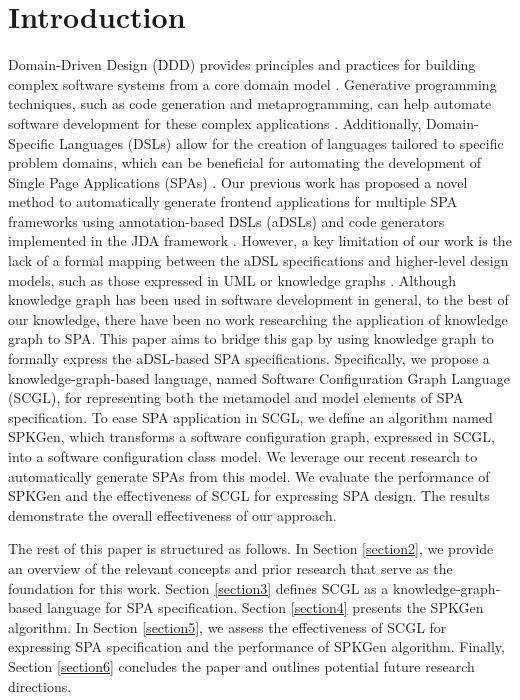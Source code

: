 \documentclass[runningheads]{llncs}
\begin{document}
\section{Introduction}

Domain-Driven Design (DDD) provides principles and practices for building complex software systems from a core domain model \cite{evans_domain-driven_2004}. Generative programming techniques, such as code generation and metaprogramming, can help automate software development for these complex applications \cite{czarnecki_generative_2002}. Additionally, Domain-Specific Languages (DSLs) allow for the creation of languages tailored to specific problem domains, which can be beneficial for automating the development of Single Page Applications (SPAs) \cite{fowler_domain-specific_2010}. Our previous work has proposed a novel method to automatically generate frontend applications for multiple SPA frameworks using annotation-based DSLs (aDSLs) and code generators implemented in the JDA framework \cite{le_jdomainapp_2019,le_generating_2022,le_modularly_2024}. However, a key limitation of our work is the lack of a formal mapping between the aDSL specifications and higher-level design models, such as those expressed in UML or knowledge graphs \cite{omg2017uml,wang_application_2023}. Although knowledge graph has been used in software development in general, to the best of our knowledge, there have been no work researching the application of knowledge graph to SPA. This paper aims to bridge this gap by using knowledge graph to formally express the aDSL-based SPA specifications. Specifically, we propose a  knowledge-graph-based language, named Software Configuration Graph Language (SCGL), for representing both the metamodel and model elements of SPA specification. To ease SPA application in SCGL, we define an algorithm named SPKGen, which transforms a software configuration graph, expressed in SCGL, into a software configuration class model. We leverage our recent research \cite{le_generating_2022,le_modularly_2024} to automatically generate SPAs from this model. We evaluate the performance of SPKGen and the effectiveness of SCGL for expressing SPA design. The results demonstrate the overall effectiveness of our approach. 

The rest of this paper is structured as follows. In Section \ref{section2}, we provide an overview of the relevant concepts and prior research that serve as the foundation for this work. Section \ref{section3} defines SCGL as a knowledge-graph-based language for SPA specification. Section \ref{section4} presents the SPKGen algorithm. In Section \ref{section5}, we assess the effectiveness of SCGL for expressing SPA specification and the performance of SPKGen algorithm. Finally, Section \ref{section6} concludes the paper and outlines potential future research directions.
\end{document}
